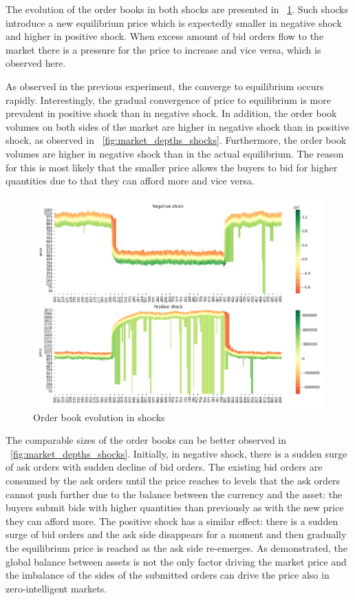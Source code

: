 The evolution of the order books in both shocks are presented in ~\ref{fig:shocks_orderbook}. Such shocks introduce a new equilibrium
price which is expectedly smaller in negative shock and higher in positive shock. When excess amount of bid orders flow to the market
there is a pressure for the price to increase and vice versa, which is observed here. 

As observed in the previous experiment, the converge to equilibrium occurs rapidly. Interestingly, the gradual convergence of price
to equilibrium is more prevalent in positive shock than in negative shock. In addition, the order book volumes on both sides of the
market are higher in negative shock than in positive shock, as observed in ~\ref{fig:market_depths_shocks}. Furthermore, the order 
book volumes are higher in negative shock than in the actual equilibrium. The reason for this is most likely that the smaller price 
allows the buyers to bid for higher quantities due to that they can afford more and vice versa. 

\begin{figure}[H]
    \includegraphics[width=\linewidth]{plots/shocks_order_book_evo.png}
    \caption{Order book evolution in shocks}
    \label{fig:shocks_orderbook}
\end{figure}

The comparable sizes of the order books can be better observed in ~\ref{fig:market_depths_shocks}. Initially, in negative shock,
there is a sudden surge of ask orders with sudden decline of bid orders. The existing bid orders are consumed by the ask orders 
until the price reaches to levels that the ask orders cannot push further due to the balance between the currency and the asset:
the buyers submit bids with higher quantities than previously as with the new price they can afford more. The positive shock has a similar 
effect: there is a sudden surge of bid orders and the ask side disappears for a moment and then gradually the equilibrium
price is reached as the ask side re-emerges. As demonstrated, the global balance between assets is not the only factor driving the 
market price and the imbalance of the sides of the submitted orders can drive the price also in zero-intelligent markets.


